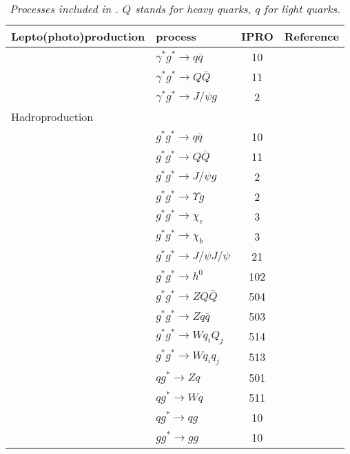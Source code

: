 \documentclass[11pt]{article} \usepackage{mystyle-new}
\def\cascade{{\sc Cascade3}}
\begin{document}
\begin{table}[htp]
\begin{center}
\begin{tabular}{|l||l|c|c|}
\hline 
Lepto(photo)production &process & IPRO & Reference \\ 
\hline
&$\gamma^* g^* \to q\bar{q} $ & 10 & \protect\cite{Catani:1990eg} \\
&$\gamma^* g^* \to Q\bar{Q} $ & 11 & \protect\cite{Catani:1990eg} \\ 
&$\gamma^* g^* \to J/\psi g $ & 2 & \protect\cite{Saleev:1994fg,Lipatov:2002tc, Baranov:2003at,Baranov:2002cf} \\
\hline
Hadroproduction& & &  \\
\hline
&$g^* g^* \to q\bar{q} $ & 10 & \protect\cite{Catani:1990eg} \\
&$g^* g^* \to Q\bar{Q} $ & 11 & \protect\cite{Catani:1990eg} \\ 
&$g^* g^* \to J/\psi g $ & 2 & \protect\cite{Baranov:2002cf} \\
&$g^* g^* \to \Upsilon g $ & 2 & \protect\cite{Baranov:2002cf} \\
&$g^* g^* \to \chi_c $ & 3 & \protect\cite{Baranov:2002cf} \\
&$g^* g^* \to \chi_b $ & 3 &\cite{Baranov:2002cf} \\
&$g^* g^* \to J/\psi J/\psi $ & 21 &\cite{Baranov:2011zz} \\
&$g^* g^* \to h^0 $ & 102 & \protect\cite{Hautmann:2002tu} \\
&$g^* g^* \to Z Q \bar{Q} $ & 504 & \protect\cite{Baranov:2008hj,Deak:2008ky} \\
&$g^* g^* \to Z q \bar{q} $ & 503 & \protect\cite{Baranov:2008hj,Deak:2008ky} \\
&$g^* g^* \to W q_i Q_j $ & 514 & \protect\cite{Baranov:2008hj,Deak:2008ky} \\
&$g^* g^* \to W q_i q_j $ & 513 & \protect\cite{Baranov:2008hj,Deak:2008ky} \\
&$q g^* \to Z q $ & 501 & \protect\cite{Marzani:2008uh} \\
&$q g^* \to W q $ & 511 & \protect\cite{Marzani:2008uh} \\
&$q g^* \to qg $ & 10 & \protect\cite{Deak:2009xt} \\
&$g g^* \to gg $ & 10 & \protect\cite{Deak:2009xt}\\
\hline
\end{tabular}
\caption{\it Processes included in \protect\cascade . $Q$ stands for heavy quarks, $q$ for light quarks.}\label{processes}
\end{center}
\end{table}%
\end{document}
